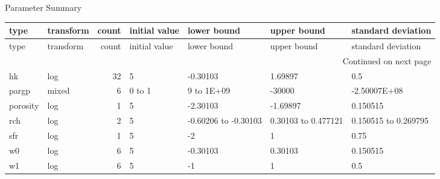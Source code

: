 \documentclass{article}
\begin{document}
\begin{center}
Parameter Summary
\end{center}
\begin{center}
\begin{landscape}
\begin{longtable}{llrllll}
type & transform & count & initial value & lower bound & upper bound & standard deviation \\
\endfirsthead
type & transform & count & initial value & lower bound & upper bound & standard deviation \\
\endhead
\multicolumn{7}{r}{Continued on next page} \\
\endfoot
\endlastfoot
hk & log & 32 &     5 & -0.30103 & 1.69897 &   0.5 \\
pargp & mixed & 6 &     0 to     1 &     9 to 1E+09 & -30000 & -2.50007E+08 \\
porosity & log & 1 &     5 & -2.30103 & -1.69897 & 0.150515 \\
rch & log & 2 &     5 & -0.60206 to -0.30103 & 0.30103 to 0.477121 & 0.150515 to 0.269795 \\
sfr & log & 1 &     5 &    -2 &     1 &  0.75 \\
w0 & log & 6 &     5 & -0.30103 & 0.30103 & 0.150515 \\
w1 & log & 6 &     5 &    -1 &     1 &   0.5 \\
\end{longtable}
\end{landscape}
\end{center}
\end{document}
